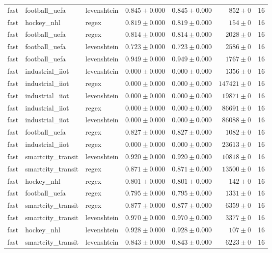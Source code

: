 \begin{table}[htbp]
\begin{tabular}{l l l r r r r}
fast & football\_uefa & levenshtein & $0.845\pm0.000$ & $0.845\pm0.000$ & $852\pm0$ & 16 \\
fast & hockey\_nhl & regex & $0.819\pm0.000$ & $0.819\pm0.000$ & $154\pm0$ & 16 \\
fast & football\_uefa & regex & $0.814\pm0.000$ & $0.814\pm0.000$ & $2028\pm0$ & 16 \\
fast & football\_uefa & levenshtein & $0.723\pm0.000$ & $0.723\pm0.000$ & $2586\pm0$ & 16 \\
fast & football\_uefa & levenshtein & $0.949\pm0.000$ & $0.949\pm0.000$ & $1767\pm0$ & 16 \\
fast & industrial\_iiot & levenshtein & $0.000\pm0.000$ & $0.000\pm0.000$ & $1356\pm0$ & 16 \\
fast & industrial\_iiot & regex & $0.000\pm0.000$ & $0.000\pm0.000$ & $147421\pm0$ & 16 \\
fast & industrial\_iiot & levenshtein & $0.000\pm0.000$ & $0.000\pm0.000$ & $19871\pm0$ & 16 \\
fast & industrial\_iiot & regex & $0.000\pm0.000$ & $0.000\pm0.000$ & $86691\pm0$ & 16 \\
fast & industrial\_iiot & levenshtein & $0.000\pm0.000$ & $0.000\pm0.000$ & $86088\pm0$ & 16 \\
fast & football\_uefa & regex & $0.827\pm0.000$ & $0.827\pm0.000$ & $1082\pm0$ & 16 \\
fast & industrial\_iiot & regex & $0.000\pm0.000$ & $0.000\pm0.000$ & $23613\pm0$ & 16 \\
fast & smartcity\_transit & levenshtein & $0.920\pm0.000$ & $0.920\pm0.000$ & $10818\pm0$ & 16 \\
fast & smartcity\_transit & regex & $0.871\pm0.000$ & $0.871\pm0.000$ & $13500\pm0$ & 16 \\
fast & hockey\_nhl & regex & $0.801\pm0.000$ & $0.801\pm0.000$ & $142\pm0$ & 16 \\
fast & football\_uefa & regex & $0.795\pm0.000$ & $0.795\pm0.000$ & $1331\pm0$ & 16 \\
fast & smartcity\_transit & regex & $0.877\pm0.000$ & $0.877\pm0.000$ & $6359\pm0$ & 16 \\
fast & smartcity\_transit & levenshtein & $0.970\pm0.000$ & $0.970\pm0.000$ & $3377\pm0$ & 16 \\
fast & hockey\_nhl & levenshtein & $0.928\pm0.000$ & $0.928\pm0.000$ & $107\pm0$ & 16 \\
fast & smartcity\_transit & levenshtein & $0.843\pm0.000$ & $0.843\pm0.000$ & $6223\pm0$ & 16 \\

\end{tabular}
\end{table}
